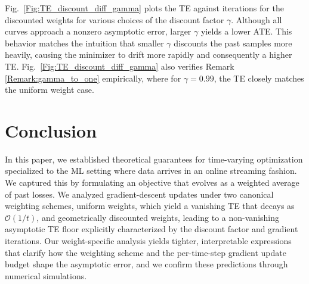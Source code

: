 \documentclass[conference]{IEEEtran}
\newcommand{\fraz}[1]{\textcolor{purple}{\bf [Fraz: #1]}}
\begin{document}
Fig.~\ref{Fig:TE_discount_diff_gamma} plots the TE against iterations for the discounted weights for various choices of the discount factor $\gamma$. Although all curves approach a nonzero asymptotic error, larger $\gamma$ yields a lower ATE. This behavior matches the intuition that smaller $\gamma$ discounts the past samples more heavily, causing the minimizer to drift more rapidly and consequently a higher TE. Fig.~\ref{Fig:TE_discount_diff_gamma} also verifies Remark \ref{Remark:gamma_to_one} empirically, where for $\gamma=0.99$, the TE closely matches the uniform weight case.


\section{Conclusion}
\label{sec:conclusion}
In this paper, we established theoretical guarantees for time-varying optimization specialized to the ML setting where data arrives in an online streaming fashion. We captured this by formulating an objective that evolves as a weighted average of past losses. We analyzed gradient-descent updates under two canonical weighting schemes, uniform weights, which yield a vanishing TE that decays as $\mathcal{O}(1/t)$, and geometrically discounted weights, leading to a non-vanishing asymptotic TE floor explicitly characterized by the discount factor and gradient iterations. Our weight-specific analysis yields tighter, interpretable expressions that clarify how the weighting scheme and the per-time-step gradient update budget shape the asymptotic error, and we confirm these predictions through numerical simulations.



\end{document}
